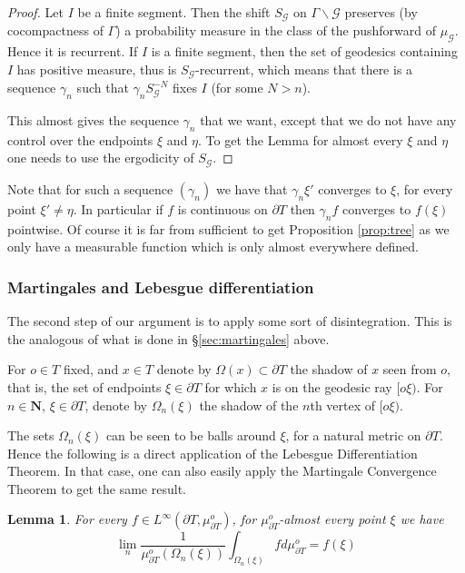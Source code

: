 \documentclass[a4paper, 11pt]{article}
\theoremstyle{plain}
\newtheorem{lemma}[proposition]{Lemma}
\theoremstyle{definition}
\theoremstyle{remark}
\newcommand{\NN}{\mathbf{N}}                          %
\begin{document}
\begin{proof}
    Let $I$ be a finite segment. Then the shift $S_{\mathscr G}$ on $\Gamma\backslash \mathscr G$ preserves (by cocompactness of $\Gamma$) a probability measure in the class of the pushforward of $\mu_{\mathscr G}$. Hence it is recurrent. If $I$ is a finite segment, then the set of geodesics containing $I$ has positive measure, thus is $S_{\mathscr G}$-recurrent, which means that there is a sequence $\gamma_n$ such that $\gamma_n S_{\mathscr G}^{-N}$ fixes $I$ (for some $N>n$).
    
    This almost gives the sequence $\gamma_n$ that we want, except that we do not have any control over the endpoints $\xi$ and $\eta$. To get the Lemma for almost every $\xi$ and $\eta$ one needs to use the ergodicity of $S_{\mathscr G}$. 
\end{proof}

Note that for such a sequence $(\gamma_n)$ we have that $\gamma_n\xi'$ converges to $\xi$, for every point $\xi'\neq \eta$. In particular if $f$ is continuous on $\partial T$ then $\gamma_n f$ converges to $f(\xi)$ pointwise. Of course it is far from sufficient to get Proposition \ref{prop:tree} as we only have a measurable function which is only almost everywhere defined.

\subsubsection{Martingales and Lebesgue differentiation}

The second step of our argument is to apply some sort of disintegration. This is the analogous of what is done in \S\ref{sec:martingales} above.

 For $o\in T$ fixed, and $x\in T$ denote by $\Omega(x)\subset\partial T$ the shadow of $x$ seen from $o$, that is, the set of endpoints $\xi\in\partial T$ for which $x$ is on the geodesic ray $[o\xi)$. For
 $n\in \NN$, $\xi\in \partial T$,  denote by $\Omega_n(\xi)$ the shadow of the $n$th vertex of $[o\xi)$.

 The sets $\Omega_n(\xi)$ can be seen to be balls around $\xi$, for a natural metric on $\partial T$. Hence the following is a direct application of the Lebesgue Differentiation Theorem. In that case, one can also easily apply the Martingale Convergence Theorem to get the same result.
 
 \begin{lemma}\label{lem:treemart}
For every $f\in L^\infty(\partial T,\mu_{\partial T}^o)$, for $\mu_{\partial T}^o$-almost every point $\xi$ we have
$$\lim_n \frac{1}{\mu_{\partial T}^o(\Omega_n(\xi))}\int_{\Omega_n(\xi)} f d\mu_{\partial T}^o = f(\xi)$$
 \end{lemma}   
\end{document}
